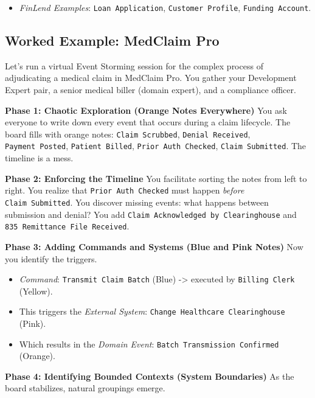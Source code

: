 \begin{enumerate}
  \begin{itemize}
  \tightlist
  \item
    \emph{FinLend Examples}: \texttt{Loan\ Application},
    \texttt{Customer\ Profile}, \texttt{Funding\ Account}.
  \end{itemize}
\end{enumerate}

\subsection{Worked Example: MedClaim
Pro}\label{worked-example-medclaim-pro}

Let's run a virtual Event Storming session for the complex process of
adjudicating a medical claim in MedClaim Pro. You gather your
Development Expert pair, a senior medical biller (domain expert), and a
compliance officer.

\textbf{Phase 1: Chaotic Exploration (Orange Notes Everywhere)} You ask
everyone to write down every event that occurs during a claim lifecycle.
The board fills with orange notes: \texttt{Claim\ Scrubbed},
\texttt{Denial\ Received}, \texttt{Payment\ Posted},
\texttt{Patient\ Billed}, \texttt{Prior\ Auth\ Checked},
\texttt{Claim\ Submitted}. The timeline is a mess.

\textbf{Phase 2: Enforcing the Timeline} You facilitate sorting the
notes from left to right. You realize that \texttt{Prior\ Auth\ Checked}
must happen \emph{before} \texttt{Claim\ Submitted}. You discover
missing events: what happens between submission and denial? You add
\texttt{Claim\ Acknowledged\ by\ Clearinghouse} and
\texttt{835\ Remittance\ File\ Received}.

\textbf{Phase 3: Adding Commands and Systems (Blue and Pink Notes)} Now
you identify the triggers.

\begin{itemize}
\tightlist
\item
  \emph{Command}: \texttt{Transmit\ Claim\ Batch} (Blue) -\textgreater{}
  executed by \texttt{Billing\ Clerk} (Yellow).
\item
  This triggers the \emph{External System}:
  \texttt{Change\ Healthcare\ Clearinghouse} (Pink).
\item
  Which results in the \emph{Domain Event}:
  \texttt{Batch\ Transmission\ Confirmed} (Orange).
\end{itemize}

\textbf{Phase 4: Identifying Bounded Contexts (System Boundaries)} As
the board stabilizes, natural groupings emerge.

